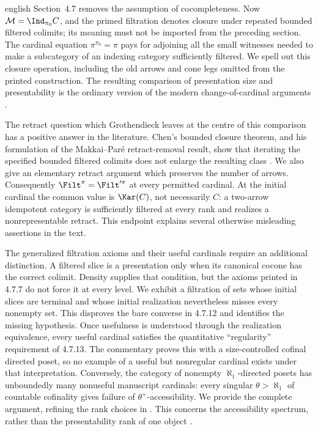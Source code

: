 \begin{otherlanguage*}{english}
Section~4.7 removes the assumption of cocompleteness. Now $\mathcal M=\Ind_{\pi_0}C$, and the primed filtration denotes closure under repeated bounded filtered colimits; its meaning must not be imported from the preceding section. The cardinal equation $\pi^{\pi_0}=\pi$ pays for adjoining all the small witnesses needed to make a subcategory of an indexing category sufficiently filtered. We spell out this closure operation, including the old arrows and cone legs omitted from the printed construction. The resulting comparison of presentation size and presentability is the ordinary version of the modern change-of-cardinal arguments \citep[\S3]{Vasey2020Accessible}.

The retract question which Grothendieck leaves at the centre of this comparison has a positive answer in the literature. Chen's bounded closure theorem, and his formulation of the Makkai--Par\'e retract-removal result, show that iterating the specified bounded filtered colimits does not enlarge the resulting class \citep[Corollaries~4.13 and~4.15]{Chen2021Sifted}. We also give an elementary retract argument which preserves the number of arrows. Consequently $\Filt^\pi=\Filt'^\pi$ at every permitted cardinal. At the initial cardinal the common value is $\Kar(C)$, not necessarily $C$: a two-arrow idempotent category is sufficiently filtered at every rank and realizes a nonrepresentable retract. This endpoint explains several otherwise misleading assertions in the text.

The generalized filtration axioms and their useful cardinals require an additional distinction. A filtered slice is a presentation only when its canonical cocone has the correct colimit. Density supplies that condition, but the axioms printed in 4.7.7 do not force it at every level. We exhibit a filtration of sets whose initial slices are terminal and whose initial realization nevertheless misses every nonempty set. This disproves the bare converse in 4.7.12 and identifies the missing hypothesis. Once usefulness is understood through the realization equivalence, every useful cardinal satisfies the quantitative ``regularity'' requirement of 4.7.13. The commentary proves this with a size-controlled cofinal directed poset, so no example of a useful but nonregular cardinal exists under that interpretation. Conversely, the category of nonempty $\aleph_1$-directed posets has unboundedly many nonuseful manuscript cardinals: every singular $\theta>\aleph_1$ of countable cofinality gives failure of $\theta^+$-accessibility. We provide the complete argument, refining the rank choices in \citet[Example~3.8]{Vasey2020Accessible}. This concerns the accessibility spectrum, rather than the presentability rank of one object \citep{LiebermanRosickyVasey2019Sizes}.


\end{otherlanguage*}
